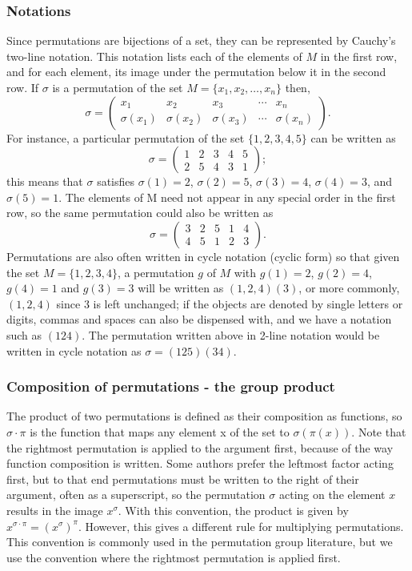 \subsubsection{Notations}
Since permutations are bijections of a set, they can be represented by Cauchy's two-line notation. This notation
lists each of the elements of $M$ in the first row, and for each element, its image under the permutation below
it in the second row.  If $\sigma$  is a permutation of the set $M=\{x_{1},x_{2},\ldots ,x_{n}\}$ then,
$$\sigma =
    {
    \begin{pmatrix}
        x_{1} & x_{2} & x_{3} & \cdots & x_{n} \\\sigma (x_{1})&\sigma (x_{2})&\sigma (x_{3})&\cdots &\sigma (x_{n})
    \end{pmatrix}
    }.
$$
For instance, a particular permutation of the set $\{1, 2, 3, 4, 5\}$ can be written as
$$\sigma ={\begin{pmatrix}1&2&3&4&5\\2&5&4&3&1\end{pmatrix}};$$
this means that $\sigma$ satisfies $\sigma(1) = 2$, $\sigma(2) = 5$, $\sigma(3) = 4$,
$\sigma(4) = 3$, and $\sigma(5) = 1$. The elements of M need not appear in any special order in the first row,
so the same permutation could also be written as
$$\sigma ={\begin{pmatrix}3&2&5&1&4\\4&5&1&2&3\end{pmatrix}}.$$
Permutations are also often written in cycle notation (cyclic form) so that given the set $M = \{1, 2, 3, 4\}$,
a permutation $g$ of $M$ with $g(1) = 2$, $g(2) = 4$, $g(4) = 1$ and $g(3) = 3$ will be written as
$(1, 2, 4)(3)$, or more commonly, $(1, 2, 4)$ since $3$ is left unchanged; if the objects are denoted by
single letters or digits, commas and spaces can also be dispensed with, and we have a notation such as $(124)$.
The permutation written above in 2-line notation would be written in cycle notation as $\sigma=(125)(34)$.

\subsubsection{Composition of permutations - the group product}
The product of two permutations is defined as their composition as functions, so
$\displaystyle \sigma \cdot \pi$ is the function that maps any element x of the set to
$\displaystyle \sigma (\pi (x))$. Note that the rightmost permutation is applied to the argument first,
because of the way function composition is written. Some authors prefer the leftmost factor acting first,
but to that end permutations must be written to the right of their argument, often as a superscript,
so the permutation $\sigma$  acting on the element $x$ results in the image
$\displaystyle x^{\sigma }$. With this convention, the product is given by
$\displaystyle x^{\sigma \cdot \pi }=(x^{\sigma })^{\pi }$. However, this gives a different rule for
multiplying permutations. This convention is commonly used in the permutation group literature, but
we use the convention where the rightmost permutation is applied first.

